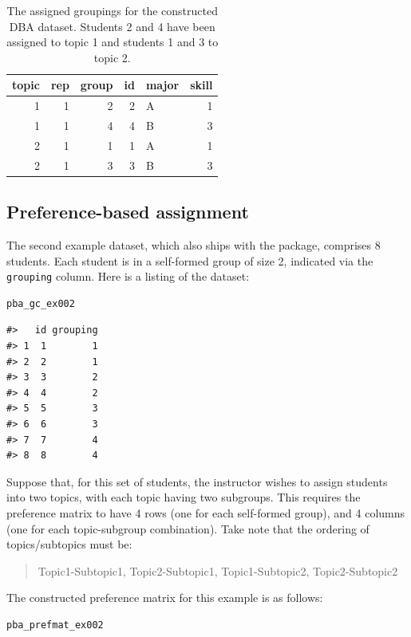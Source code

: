 \begin{table}[!h]
\centering
\caption{\label{tab:constructed-dba-2}The assigned groupings for the constructed DBA dataset. Students 2 and 4 have been assigned to topic 1 and students 1 and 3 to topic 2.}
\centering
\begin{tabular}[t]{rrrrlr}
\toprule
topic & rep & group & id & major & skill\\
\midrule
1 & 1 & 2 & 2 & A & 1\\
1 & 1 & 4 & 4 & B & 3\\
2 & 1 & 1 & 1 & A & 1\\
2 & 1 & 3 & 3 & B & 3\\
\bottomrule
\end{tabular}
\end{table}

\subsection{Preference-based assignment}\label{preference-based-assignment-1}

The second example dataset, which also ships with the package, comprises 8
students. Each student is in a self-formed group of size 2, indicated via the
\texttt{grouping} column. Here is a listing of the dataset:

\begin{verbatim}
pba_gc_ex002
\end{verbatim}

\begin{verbatim}
#>   id grouping
#> 1  1        1
#> 2  2        1
#> 3  3        2
#> 4  4        2
#> 5  5        3
#> 6  6        3
#> 7  7        4
#> 8  8        4
\end{verbatim}

Suppose that, for this set of students, the instructor wishes to assign
students into two topics, with each topic having two subgroups. This requires
the preference matrix to have 4 rows (one for each self-formed group), and 4
columns (one for each topic-subgroup combination). Take note that the ordering
of topics/subtopics must be:

\begin{quote}
Topic1-Subtopic1, Topic2-Subtopic1, Topic1-Subtopic2, Topic2-Subtopic2
\end{quote}

The constructed preference matrix for this example is as follows:

\begin{verbatim}
pba_prefmat_ex002
\end{verbatim}

